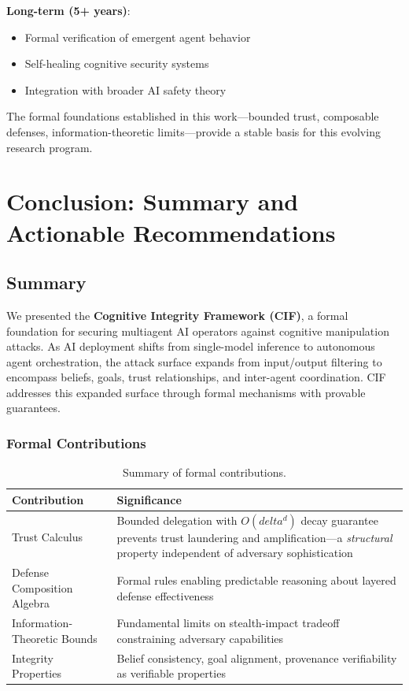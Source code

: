 \documentclass[
]{article}
\begin{document}
\textbf{Long-term (5+ years)}:

\begin{itemize}
\item Formal verification of emergent agent behavior
\item Self-healing cognitive security systems
\item Integration with broader AI safety theory
\end{itemize}

The formal foundations established in this work---bounded trust,
composable defenses, information-theoretic limits---provide a stable
basis for this evolving research program.

\newpage

\newpage

\section{Conclusion: Summary and Actionable
Recommendations}\label{conclusion-summary-and-actionable-recommendations}

\subsection{Summary}\label{sec:summary}

We presented the \textbf{Cognitive Integrity Framework (CIF)}, a formal
foundation for securing multiagent AI operators against cognitive
manipulation attacks. As AI deployment shifts from single-model
inference to autonomous agent orchestration, the attack surface expands
from input/output filtering to encompass beliefs, goals, trust
relationships, and inter-agent coordination. CIF addresses this expanded
surface through formal mechanisms with provable guarantees.

\subsubsection{Formal Contributions}\label{formal-contributions}

\begin{table}[htbp]
\centering
\caption{Summary of formal contributions.}
\label{tab:formal-contributions}
\begin{tabular}{@{}lp{8cm}@{}}
\toprule
Contribution & Significance \\
\midrule
Trust Calculus & Bounded delegation with $O(delta^d)$ decay guarantee prevents trust laundering and amplification---a \textit{structural} property independent of adversary sophistication \\
Defense Composition Algebra & Formal rules enabling predictable reasoning about layered defense effectiveness \\
Information-Theoretic Bounds & Fundamental limits on stealth-impact tradeoff constraining adversary capabilities \\
Integrity Properties & Belief consistency, goal alignment, provenance verifiability as verifiable properties \\
\bottomrule
\end{tabular}
\end{table}
\end{document}

